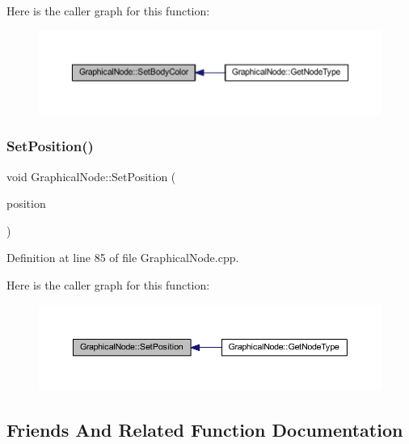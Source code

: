 Here is the caller graph for this function\+:
\nopagebreak
\begin{figure}[H]
\begin{center}
\leavevmode
\includegraphics[width=350pt]{class_graphical_node_ae0cbf2cfe00306e2cfc610c5eb4cb89b_icgraph}
\end{center}
\end{figure}
\mbox{\label{class_graphical_node_a61cb6a7d32ae7db370336639d83fc2bd}} 
\subsubsection{\texorpdfstring{Set\+Position()}{SetPosition()}}
{\footnotesize\ttfamily void Graphical\+Node\+::\+Set\+Position (\begin{DoxyParamCaption}\item[{const wx\+Point2\+D\+Double \&}]{position }\end{DoxyParamCaption})}



Definition at line 85 of file Graphical\+Node.\+cpp.

Here is the caller graph for this function\+:
\nopagebreak
\begin{figure}[H]
\begin{center}
\leavevmode
\includegraphics[width=350pt]{class_graphical_node_a61cb6a7d32ae7db370336639d83fc2bd_icgraph}
\end{center}
\end{figure}


\subsection{Friends And Related Function Documentation}
\mbox{\label{class_graphical_node_a2a860a1faf189243ba02f50ad8362bfa}} 
